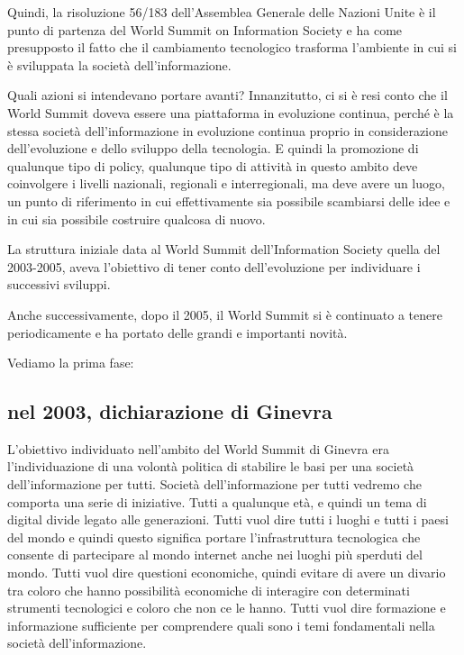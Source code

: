 Quindi, la risoluzione 56/183 dell'Assemblea Generale delle Nazioni Unite è il punto di partenza del World Summit on Information Society e ha come presupposto il fatto che il cambiamento tecnologico trasforma l'ambiente in cui si è sviluppata la società dell'informazione.

Quali azioni si intendevano portare avanti? Innanzitutto, ci si è resi conto che il World Summit doveva essere una piattaforma in evoluzione continua, perché è la stessa società dell'informazione in evoluzione continua proprio in considerazione dell'evoluzione e dello sviluppo della tecnologia. E quindi la promozione di qualunque tipo di policy, qualunque tipo di attività in questo ambito deve coinvolgere i livelli nazionali, regionali e interregionali, ma deve avere un luogo, un punto di riferimento in cui effettivamente sia possibile scambiarsi delle idee e in cui sia possibile costruire qualcosa di nuovo.

La struttura iniziale data al World Summit dell'Information Society quella del 2003-2005, aveva l'obiettivo di tener conto dell'evoluzione per individuare i successivi sviluppi.

Anche successivamente, dopo il 2005, il World Summit si è continuato a tenere periodicamente e ha portato delle grandi e importanti novità.

Vediamo la prima fase:

\subsection{nel 2003, dichiarazione di Ginevra}

L'obiettivo individuato nell'ambito del World Summit di Ginevra era l'individuazione di una volontà politica di stabilire le basi per una società dell'informazione per tutti. Società dell'informazione per tutti vedremo che comporta una serie di iniziative. Tutti a qualunque età, e quindi un tema di digital divide legato alle generazioni. Tutti vuol dire tutti i luoghi e tutti i paesi del mondo e quindi questo significa portare l'infrastruttura tecnologica che consente di partecipare al mondo internet anche nei luoghi più sperduti del mondo. Tutti vuol dire questioni economiche, quindi evitare di avere un divario tra coloro che hanno possibilità economiche di interagire con determinati strumenti tecnologici e coloro che non ce le hanno. Tutti vuol dire formazione e informazione sufficiente per comprendere quali sono i temi fondamentali nella società dell'informazione.

